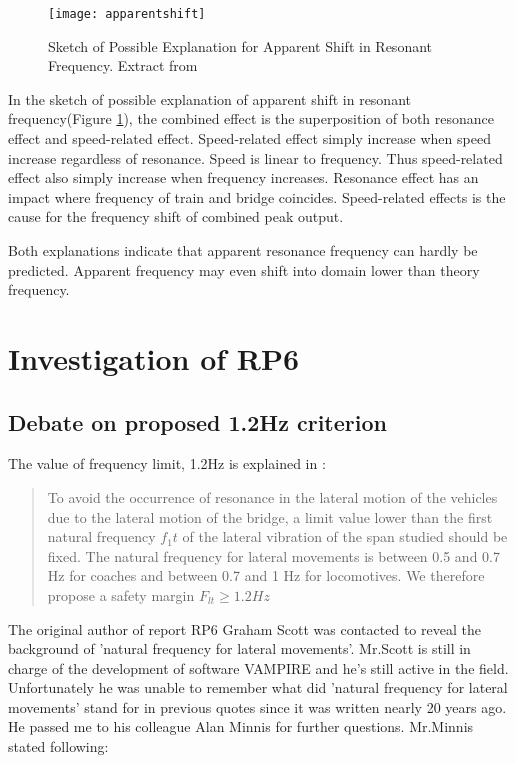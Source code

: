 \begin{figure}[h]
    \centering
    \texttt{[image: apparentshift]}
    \caption{Sketch of Possible Explanation for Apparent Shift in Resonant Frequency. Extract from \cite[Appendix 2]{d181dt329}}
    \label{fig:apparentshift}
\end{figure}

In the sketch of possible explanation of apparent shift in resonant frequency(Figure \ref{fig:apparentshift}), the combined effect is the superposition of both resonance effect and speed-related effect. Speed-related effect simply increase when speed increase regardless of resonance. Speed is linear to frequency. Thus speed-related effect also simply increase when frequency increases. Resonance effect has an impact where frequency of train and bridge coincides. Speed-related effects is the cause for the frequency shift of combined peak output.

Both explanations indicate that apparent resonance frequency can hardly be predicted. Apparent frequency may even shift into domain lower than theory frequency. 


\section{Investigation of RP6}

\subsection{Debate on proposed 1.2Hz criterion}\label{sec:1.2criterion329}

The value of frequency limit, 1.2Hz is explained in \cite[p3.2: Criterion 2]{d181}:

\begin{quote}
To avoid the occurrence of resonance in the lateral motion of the vehicles due to the lateral motion of the bridge, a limit value lower than the first natural frequency $f_1t$ of the lateral vibration of the span studied should be fixed. The natural frequency for lateral movements is between 0.5 and 0.7 Hz for coaches and between 0.7 and 1 Hz for locomotives. We therefore propose a safety margin $F_{lt} \geq 1.2Hz$

\end{quote}

The original author of report RP6 Graham Scott was contacted to reveal the background of 'natural frequency for lateral movements'. Mr.Scott is still in charge of the development of software VAMPIRE and he's still active in the field. Unfortunately he was unable to remember what did 'natural frequency for lateral movements' stand for in previous quotes since it was written nearly 20 years ago. He passed me to his colleague Alan Minnis for further questions. Mr.Minnis stated following:


